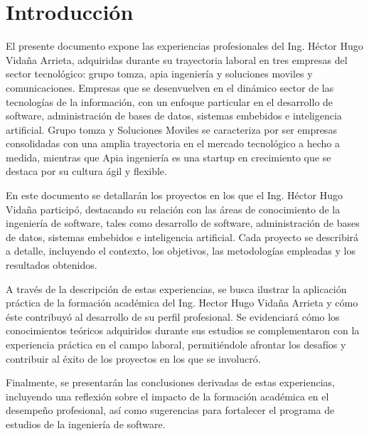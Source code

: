 \documentclass[final, fmstyle, 12pt]{article}
\begin{document}
\section{Introducción}
\setlength{\parskip}{1em} 
El presente documento expone las experiencias profesionales del Ing. Héctor Hugo Vidaña Arrieta, 
adquiridas durante su trayectoria laboral en tres empresas del sector tecnológico: 
grupo tomza, apia ingeniería y soluciones moviles y comunicaciones. 
Empresas que se desenvuelven en el dinámico sector de las tecnologías de la información, 
con un enfoque particular en el desarrollo de software, administración de bases de datos,
sistemas embebidos e inteligencia artificial. Grupo tomza y Soluciones Moviles se caracteriza por ser empresas consolidadas con una amplia trayectoria en el mercado tecnológico a hecho a medida, mientras que Apia ingeniería es una startup en crecimiento que se destaca por su cultura ágil y flexible.

En este documento se detallarán los proyectos en los que el Ing. Héctor Hugo Vidaña participó, destacando su relación con las áreas de conocimiento de la ingeniería de software, tales como  desarrollo de software, administración de bases de datos,
sistemas embebidos e inteligencia artificial.  Cada proyecto se describirá a detalle, incluyendo el contexto, los objetivos, las metodologías empleadas y los resultados obtenidos.

A través de la descripción de estas experiencias, se busca ilustrar la aplicación práctica de la formación académica del Ing. Hector Hugo Vidaña Arrieta y cómo éste contribuyó al desarrollo de su perfil profesional. Se  evidenciará cómo los conocimientos teóricos adquiridos durante sus estudios se complementaron con la experiencia práctica en el campo laboral,  permitiéndole afrontar los desafíos y  contribuir al éxito de los proyectos en los que se involucró.

Finalmente, se presentarán las conclusiones derivadas de estas experiencias, incluyendo una reflexión sobre el impacto de la formación académica en el desempeño profesional,  así como  sugerencias para fortalecer el programa de estudios de la ingeniería de software.
\newpage
\tableofcontents 
\end{document}
